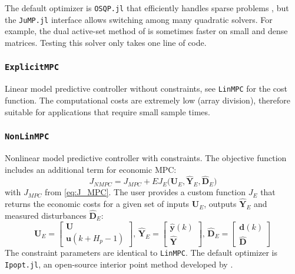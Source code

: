 The default optimizer is \texttt{OSQP.jl} that efficiently handles sparse problems \citep{osqp}, but the \texttt{JuMP.jl} interface allows switching among many quadratic solvers. For example, the dual active-set method of \citet{daqp} is sometimes faster on small and dense matrices. Testing this solver only takes one line of code.

\subsubsection{\textnormal{\texttt{ExplicitMPC}}}
Linear model predictive controller without constraints, see \texttt{LinMPC} for the cost function. The computational costs are extremely low (array division), therefore suitable for applications that require small sample times.

\subsubsection{\textnormal{\texttt{NonLinMPC}}}
Nonlinear model predictive controller with constraints. The objective function includes an additional term for economic MPC:
\begin{equation}
J_{\mathit{NMPC}} = J_{\mathit{MPC}} 
    + E J_E\big(\mathbf{U}_E, \mathbf{\hat{Y}}_E, \mathbf{\hat{D}}_E\big)
\end{equation}
with $J_{\mathit{MPC}}$ from \eqref{eq:J_MPC}. The user provides a custom function $J_E$ that returns the economic costs for a given set of inputs $\mathbf{U}_E$, outputs $\mathbf{\hat{Y}}_E$ and measured disturbances $\mathbf{\hat{D}}_E$:
\begin{equation}
\mathbf{U}_E = 
\begin{bmatrix}
    \mathbf{U} \\ \mathbf{u}(k+H_p-1)
\end{bmatrix}\!,\,
\mathbf{\hat{Y}}_E = 
\begin{bmatrix}
    \mathbf{\hat{y}}(k) \\ \mathbf{\hat{Y}}
\end{bmatrix}\!,\, 
\mathbf{\hat{D}}_E = 
\begin{bmatrix}
    \mathbf{d}(k) \\ \mathbf{\hat{D}}
\end{bmatrix} 
\end{equation} 
The constraint parameters are identical to \texttt{LinMPC}. The default optimizer is \texttt{Ipopt.jl}, an open-source interior point method developed by \citet{ipopt}.
